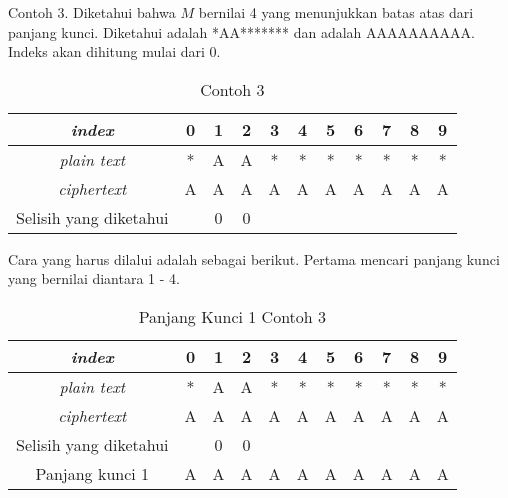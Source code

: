 		
	Contoh 3. Diketahui bahwa $M$ bernilai 4 yang menunjukkan batas atas dari panjang kunci. Diketahui \plaintext adalah *AA******* dan \ciphertext adalah AAAAAAAAAA. Indeks akan dihitung mulai dari 0. 
	 \begin{table}[H]
	 	\centering
	 	\caption{Contoh 3}
	 	\begin{tabular}{|c|c|c|c|c|c|c|c|c|c|c|}\hline
	 	\textit{index}&0&1&2&3&4&5&6&7&8&9\\ \hline
	 	\textit{plain text}&*&A&A&*&*&*&*&*&*&*\\ \hline
	 	\textit{ciphertext}&A&A&A&A&A&A&A&A&A&A\\ \hline
		Selisih yang diketahui & &0&0& & & & & & & \\ \hline	 	
	 	\end{tabular}
	 	\label{tab:contoh3}
	\end{table}
	
	Cara yang harus dilalui adalah sebagai berikut. Pertama mencari panjang kunci yang bernilai diantara 1 - 4. \\
	
	\begin{table}[H]
	 	\centering
	 	\caption{Panjang Kunci 1 Contoh 3}
	 	\setlength{\arrayrulewidth}{.08em}
	 	\begin{tabular}{|c|c|c|c|c|c|c|c|c|c|c|}\hline
	 	\textit{index}&0&1&2&3&4&5&6&7&8&9\\ \hline
	 	\textit{plain text}&\cellcolor{blue!15}*&\cellcolor{yellow!25}A&\cellcolor{green!15}A&\cellcolor{lime!25}*&\cellcolor{pink!30}*&\cellcolor{red!15}*&\cellcolor{violet!30}*&\cellcolor{magenta!15}*&\cellcolor{purple!25}*&\cellcolor{teal!35}*\\ \hline
	 	\textit{ciphertext}&\cellcolor{blue!15}A&\cellcolor{yellow!25}A&\cellcolor{green!15}A&\cellcolor{lime!25}A&\cellcolor{pink!30}A&\cellcolor{red!15}A&\cellcolor{violet!30}A&\cellcolor{magenta!15}A&\cellcolor{purple!25}A&\cellcolor{teal!35}A\\ \hline
		Selisih yang diketahui & &0&0& & & & & & & \\ \hline	
		Panjang kunci 1 &A&A&A&A&A&A&A&A&A&A\\ \hline 	
	 	\end{tabular}
	 	\label{tab:k1contoh3}
	\end{table}
	
